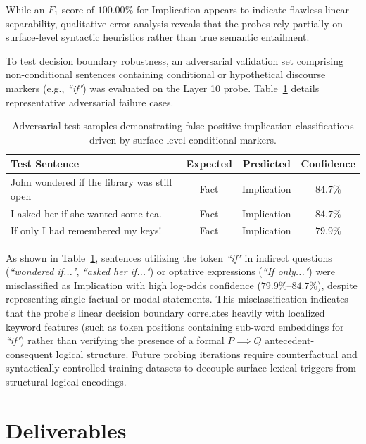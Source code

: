 \documentclass[12 pt]{article}  %
\begin{document}
While an $F_1$ score of $100.00\%$ for Implication appears to indicate flawless 
linear separability, qualitative error analysis reveals that the probes rely 
partially on surface-level syntactic heuristics rather than true semantic 
entailment. 

To test decision boundary robustness, an adversarial validation set comprising 
non-conditional sentences containing conditional or hypothetical discourse 
markers (e.g., \textit{``if"}) was evaluated on the Layer 10 probe. 
Table~\ref{tbl:results-adversary} details representative adversarial failure 
cases.

\begin{table}[ht!]
\centering
\begin{tabular}{lccc}
\hline
\textbf{Test Sentence} & \textbf{Expected} & \textbf{Predicted} & \textbf{Confidence} \\ \hline
John wondered if the library was still open & Fact & Implication & $84.7\%$ \\
I asked her if she wanted some tea.         & Fact & Implication & $84.7\%$ \\
If only I had remembered my keys!           & Fact & Implication & $79.9\%$ \\ \hline
\end{tabular}
\caption{Adversarial test samples demonstrating false-positive implication classifications driven by surface-level conditional markers.}
\label{tbl:results-adversary}
\end{table}

As shown in Table~\ref{tbl:results-adversary}, sentences utilizing the token 
\textit{``if"} in indirect questions (\textit{``wondered if..."}, 
\textit{``asked her if..."}) or optative expressions (\textit{``If only..."}) were 
misclassified as Implication with high log-odds confidence ($79.9\%$--$84.7\%$), 
despite representing single factual or modal statements. This misclassification 
indicates that the probe's linear decision boundary correlates heavily with 
localized keyword features (such as token positions containing sub-word 
embeddings for \textit{``if"}) rather than verifying the presence of a formal 
$P \implies Q$ antecedent-consequent logical structure. Future probing 
iterations require counterfactual and syntactically controlled training 
datasets to decouple surface lexical triggers from structural logical encodings.

\newpage
\section{Deliverables}
\end{document}
